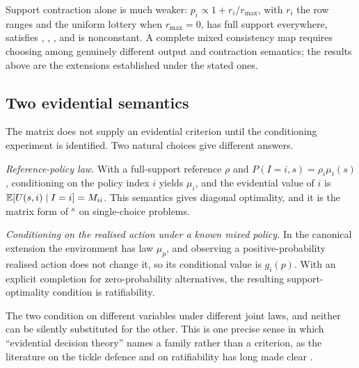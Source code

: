 Support contraction alone is much weaker: $p_i\propto1+r_i/r_{\max}$, with $r_i$ the row ranges and the
uniform lottery when $r_{\max}=0$, has full support everywhere, satisfies , , , and is
nonconstant. A complete mixed consistency map requires choosing among genuinely different output and
contraction semantics; the results above are the extensions established under the stated ones.

\subsection{Two evidential semantics}\label{sec:evsem}

The matrix does not supply an evidential criterion until the conditioning experiment is identified.
Two natural choices give different answers.

\emph{Reference-policy law.} With a full-support reference $\rho$ and $P(I=i,s)=\rho_i\mu_i(s)$,
conditioning on the policy index $i$ yields $\mu_i$, and the evidential value of $i$ is
$\mathbb{E}[U(s,i)\mid I=i]=M_{ii}$. This semantics gives diagonal optimality, and it is the matrix form of
$^\kappa$ on single-choice problems.

\emph{Conditioning on the realised action under a known mixed policy.} In the canonical extension the
environment has law $\mu_p$, and observing a positive-probability realised action does not change it,
so its conditional value is $g_i(p)$. With an explicit completion for zero-probability alternatives,
the resulting support-optimality condition is ratifiability.

The two condition on different variables under different joint laws, and neither can be silently
substituted for the other. This is one precise sense in which \enquote{evidential decision theory}
names a family rather than a criterion, as the literature on the tickle defence and on ratifiability
has long made clear \autocite{eells1982,jeffrey1983}.
